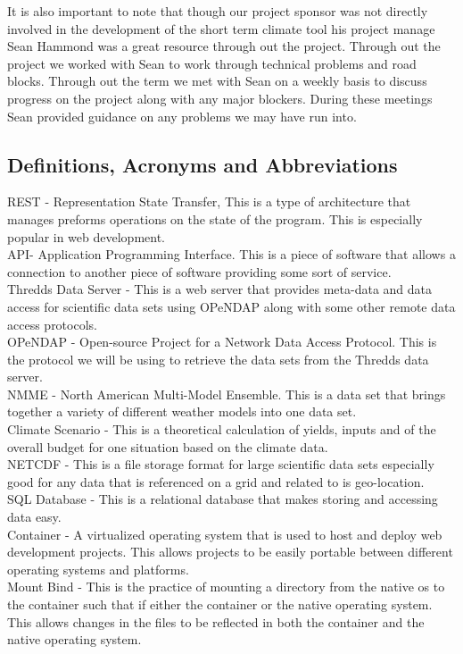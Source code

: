 \documentclass[onecolumn, draftclsnofoot,10pt, compsoc]{article}
\begin{document}
            It is also important to note that though our project sponsor was not directly involved in the development of the short term climate tool his project manage Sean Hammond was a great resource through out the project. Through out the project we worked with Sean to work through technical problems and road blocks. Through out the term we met with Sean on a weekly basis to discuss progress on the project along with any major blockers. During these meetings Sean provided guidance on any problems we may have run into.\\

		\subsection{Definitions, Acronyms and Abbreviations}
			REST - Representation State Transfer, This is a type of architecture that manages preforms operations on the state of the program. This is especially popular in web development.\\
			API- Application Programming Interface. This is a piece of software that allows a connection to another piece of software providing some sort of service.\\
			Thredds Data Server - This is a web server that provides meta-data and data access for scientific data sets using OPeNDAP along with some other remote data access protocols.\\
			OPeNDAP - Open-source Project for a Network Data Access Protocol. This is the protocol we will be using to retrieve the data sets from the Thredds data server.\\
			NMME - North American Multi-Model Ensemble. This is a data set that brings together a variety of different weather models into one data set.\\
			Climate Scenario - This is a theoretical calculation of yields, inputs and of the overall budget for one situation based on the climate data.\\
			NETCDF - This is a file storage format for large scientific data sets especially good for any data that is referenced on a grid and related to is geo-location.\\
			SQL Database - This is a relational database that makes storing and accessing data easy.\\
			Container - A virtualized operating system that is used to host and deploy web development projects. This allows projects to be easily portable between different operating systems and platforms.\\
			Mount Bind - This is the practice of mounting a directory from the native os to the container such that if either the container or the native operating system. This allows changes in the files to be reflected in both the container and the native operating system.\\
			
\end{document}
